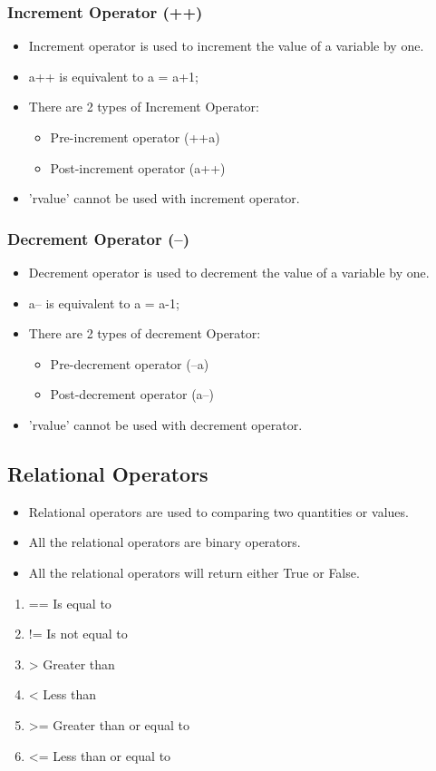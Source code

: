 \subsubsection{Increment Operator (++)}
\begin{itemize}
    \item Increment operator is used to increment the value of a variable by one. 
    \item a++ is equivalent to a = a+1;
    \item There are 2 types of Increment Operator:
    \begin{itemize}
        \item Pre-increment operator (++a)
        \item Post-increment operator (a++)
    \end{itemize}
    \item 'rvalue' cannot be used with increment operator.
\end{itemize}

\subsubsection{Decrement Operator (--)}
\begin{itemize}
    \item Decrement operator is used to decrement the value of a variable by one. 
    \item a-- is equivalent to a = a-1;
    \item There are 2 types of decrement Operator:
    \begin{itemize}
        \item Pre-decrement operator (--a)
        \item Post-decrement operator (a--)
    \end{itemize}
    \item 'rvalue' cannot be used with decrement operator.
\end{itemize}

\subsection{Relational Operators}

\begin{itemize}
    \item Relational operators are used to comparing two quantities or values. 
    \item All the relational operators are binary operators.
    \item All the relational operators will return either True or False.
\end{itemize}
\begin{enumerate}
    \item == Is equal to
    \item != Is not equal to
    \item >	Greater than
    \item <	Less than
    \item >= Greater than or equal to
    \item <= Less than or equal to
\end{enumerate}

